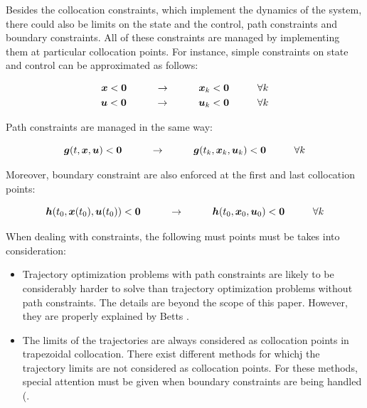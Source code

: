 \documentclass{thesisreport}
\begin{document}
Besides the collocation constraints, which implement the dynamics of the system, there could also be limits on the state and the control, path constraints and boundary constraints. All of these constraints are managed by implementing them at particular collocation points. For instance, simple constraints on state and control can be approximated as follows:

\begin{align}
\bm{x}< \bm{0} \text{\hspace{1cm}} \rightarrow \text{\hspace{1cm}} \bm{x}_k <\bm{0} \text{\hspace{1cm}} \forall k \\
\bm{u}< \bm{0} \text{\hspace{1cm}} \rightarrow \text{\hspace{1cm}} \bm{u}_k <\bm{0} \text{\hspace{1cm}} \forall k 
\end{align}
 
 Path constraints are managed in the same way: 
 
 \begin{equation}
 \bm{g}(t, \bm{x},\bm{u}) < \bm{0} \text{\hspace{1cm}} \rightarrow \text{\hspace{1cm}} \bm{g}(t_k, \bm{x}_k, \bm{u}_k) <\bm{0} \text{\hspace{1cm}} \forall k \\
 \end{equation}
 
 Moreover, boundary constraint are also enforced at the first and last collocation points:
 
 \begin{equation}
 \bm{h}(t_0, \bm{x}(t_0),\bm{u}(t_0)) < \bm{0} \text{\hspace{1cm}} \rightarrow \text{\hspace{1cm}} \bm{h}(t_0, \bm{x}_0, \bm{u}_0) <\bm{0} \text{\hspace{1cm}} \forall k \\
 \end{equation} 
 
 
 When dealing with constraints, the following must points must be takes into consideration: 
 
 \begin{itemize}
 	\item Trajectory optimization problems with path constraints are likely to be considerably harder to solve than trajectory optimization problems without path constraints. The details are beyond the scope of this paper. However, they are properly explained by Betts \cite{Betts2010}.
 	\item The limits of the trajectories are always considered as collocation points in trapezoidal collocation. There exist different methods for whichj the trajectory limits are not considered as collocation points. For these methods, special attention must be given when boundary constraints are being handled (\cite{Benson2006, Garg2010}.
 \end{itemize}
 
\end{document}
